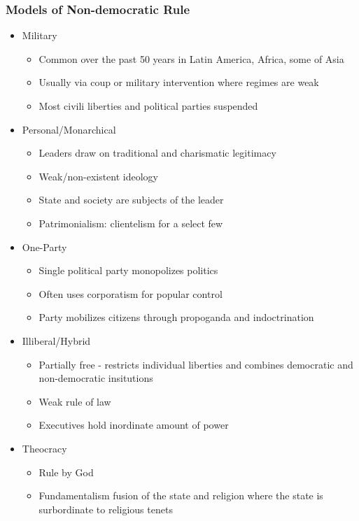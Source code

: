 \documentclass[11pt]{article}
\begin{document}
\subsubsection{Models of Non-democratic Rule}
\label{sec:orge0a45bb}
\begin{itemize}
\item Military
\begin{itemize}
\item Common over the past 50 years in Latin America, Africa, some of Asia
\item Usually via coup or military intervention where regimes are weak
\item Most civili liberties and political parties suspended
\end{itemize}
\item Personal/Monarchical
\begin{itemize}
\item Leaders draw on traditional and charismatic legitimacy
\item Weak/non-existent ideology
\item State and society are subjects of the leader
\item Patrimonialism: clientelism for a select few
\end{itemize}
\item One-Party
\begin{itemize}
\item Single political party monopolizes politics
\item Often uses corporatism for popular control
\item Party mobilizes citizens through propoganda and indoctrination
\end{itemize}
\item Illiberal/Hybrid
\begin{itemize}
\item Partially free - restricts individual liberties and combines democratic and non-democratic insitutions
\item Weak rule of law
\item Executives hold inordinate amount of power
\end{itemize}
\item Theocracy
\begin{itemize}
\item Rule by God
\item Fundamentalism fusion of the state and religion where the state is surbordinate to religious tenets
\end{itemize}
\end{itemize}
\end{document}
